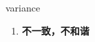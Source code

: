 
\begin{frame}
{\huge variance}
\begin{center}
\begin{enumerate}\Large
  \item \textbf{不一致，不和谐}
\end{enumerate}
\end{center}
\end{frame}
